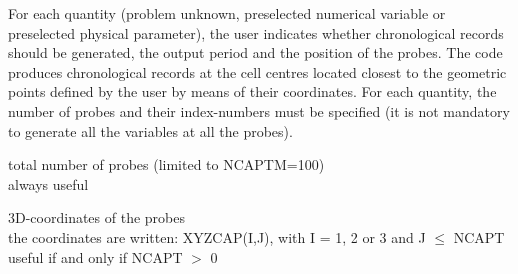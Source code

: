 For each quantity (problem unknown, preselected numerical variable or
preselected physical parameter), the user indicates whether chronological records
should be generated, the output period and the position of the
probes. The code produces chronological records at the cell centres located
closest to the geometric points defined by the user by means of their
coordinates. For each quantity, the number of probes and their
index-numbers must be specified (it is not mandatory to generate all
the variables at all the probes). 


{total number of probes (limited to NCAPTM=100)\\
always useful }

{3D-coordinates of the probes\\
the coordinates are written: XYZCAP(I,J), with I = 1, 2 or 3 and J
$\leqslant$ NCAPT\\ 
useful if and only if NCAPT $>$ 0}


